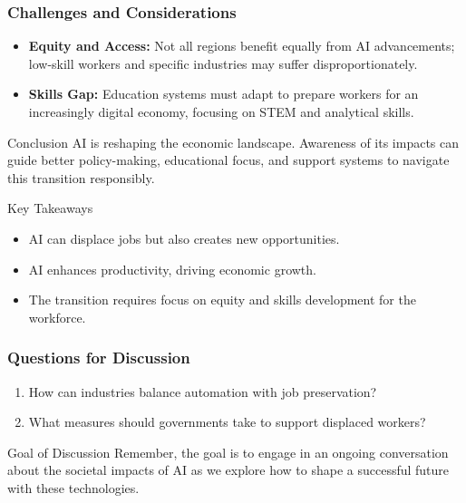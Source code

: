 \documentclass[aspectratio=169]{beamer}
\begin{document}
\begin{frame}[fragile]
    \frametitle{Challenges and Considerations}
    \begin{itemize}
        \item \textbf{Equity and Access:} Not all regions benefit equally from AI advancements; low-skill workers and specific industries may suffer disproportionately.
        \item \textbf{Skills Gap:} Education systems must adapt to prepare workers for an increasingly digital economy, focusing on STEM and analytical skills.
    \end{itemize}
    
    \begin{block}{Conclusion}
        AI is reshaping the economic landscape. Awareness of its impacts can guide better policy-making, educational focus, and support systems to navigate this transition responsibly.
    \end{block}
    
    \begin{block}{Key Takeaways}
        \begin{itemize}
            \item AI can displace jobs but also creates new opportunities.
            \item AI enhances productivity, driving economic growth.
            \item The transition requires focus on equity and skills development for the workforce.
        \end{itemize}
    \end{block}
\end{frame}

\begin{frame}[fragile]
    \frametitle{Questions for Discussion}
    \begin{enumerate}
        \item How can industries balance automation with job preservation?
        \item What measures should governments take to support displaced workers?
    \end{enumerate}
    
    \begin{block}{Goal of Discussion}
        Remember, the goal is to engage in an ongoing conversation about the societal impacts of AI as we explore how to shape a successful future with these technologies.
    \end{block}
\end{frame}
\end{document}
